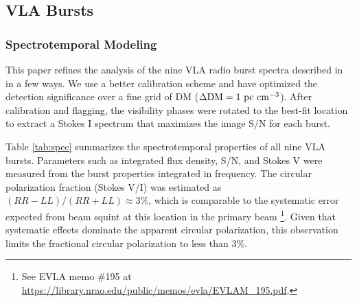 \documentclass[twocolumn]{aastex61}
\begin{document}
\subsection{VLA Bursts}

\subsubsection{Spectrotemporal Modeling}
\label{sec:spec}

This paper refines the analysis of the nine VLA radio burst spectra described in \citet{LOC} in a few ways. We use a better calibration scheme and have optimized the detection significance over a fine grid of DM ($\Delta \rm{DM}=1\ \rm{pc}\ \rm{cm}^{-3}$). After calibration and flagging, the visibility phases were rotated to the best-fit location \citep[RA, Dec $=$ 05h31m58.70s, +33d08m52.5s;][]{LOC} to extract a Stokes I spectrum that maximizes the image S/N for each burst.

Table \ref{tab:spec} summarizes the spectrotemporal properties of all nine VLA bursts. Parameters such as integrated flux density, S/N, and Stokes V were measured from the burst properties integrated in frequency. The circular polarization fraction (Stokes V/I) was estimated as $(RR-LL)/(RR+LL)\approx3\%$, which is comparable to the systematic error expected from beam squint at this location in the primary beam \footnote{See EVLA memo \#195 at \url{https://library.nrao.edu/public/memos/evla/EVLAM_195.pdf}.}. Given that systematic effects dominate the apparent circular polarization, this observation limits the fractional circular polarization to less than 3\%.
\end{document}
